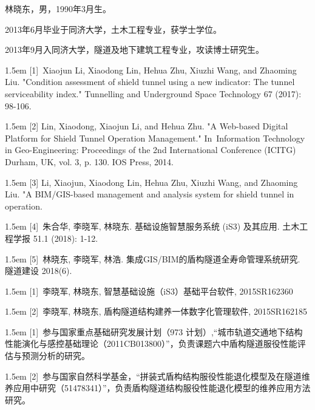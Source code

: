 \begin{resume}

	林晓东，男，1990年3月生。

	2013年6月毕业于同济大学，土木工程专业，获学士学位。

	2013年9月入同济大学，隧道及地下建筑工程专业，攻读博士研究生。


	\hangindent 1.5em
	[1]~Xiaojun Li, Xiaodong Lin, Hehua Zhu, Xiuzhi Wang, and Zhaoming Liu. "Condition assessment of shield tunnel using a new indicator: The tunnel serviceability index." Tunnelling and Underground Space Technology 67 (2017): 98-106.

	\hangindent 1.5em
	[2] Lin, Xiaodong, Xiaojun Li, and Hehua Zhu. "A Web-based Digital Platform for Shield Tunnel Operation Management." In Information Technology in Geo-Engineering: Proceedings of the 2nd International Conference (ICITG) Durham, UK, vol. 3, p. 130. IOS Press, 2014.

	\hangindent 1.5em
	[3] Li, Xiaojun, Xiaodong Lin, Hehua Zhu, Xiuzhi Wang, and Zhaoming Liu. "A BIM/GIS-based management and analysis system for shield tunnel in operation.

	\hangindent 1.5em
	[4]~朱合华, 李晓军, 林晓东. 基础设施智慧服务系统 (iS3) 及其应用. 土木工程学报 51.1 (2018): 1-12.

	\hangindent 1.5em
	[5]~林晓东, 李晓军, 林浩. 集成GIS/BIM的盾构隧道全寿命管理系统研究. 隧道建设 2018(6).






	\hangindent 1.5em
	[1]~李晓军, 林晓东, 智慧基础设施（iS3）基础平台软件, 2015SR162360

	\hangindent 1.5em
	[2]~李晓军, 林晓东, 盾构隧道结构建养一体数字化管理软件, 2015SR162185


	\hangindent 1.5em
	[1]~参与国家重点基础研究发展计划（973 计划）,“城市轨道交通地下结构性能演化与感控基础理论（2011CB013800）”，负责课题六中盾构隧道服役性能评估与预测分析的研究。

	\hangindent 1.5em
	[2]~参与国家自然科学基金，“拼装式盾构结构服役性能退化模型及在隧道维养应用中研究（51478341）”，负责盾构隧道结构服役性能退化模型的维养应用方法研究。

\end{resume}